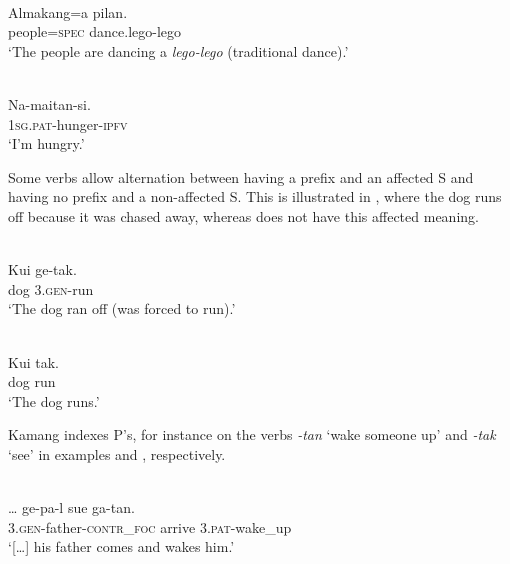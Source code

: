 \ea 
\label{ex:10:1235}
 \\
 \gll      Almakang=a   pilan.    \\
    people=\textsc{spec} dance.lego-lego    \\
 \glt  `The people are dancing a \textit{lego-lego} (traditional dance).'
\z

 

 




\ea%
\label{bkm:Ref353455458}
 \\
\gll     Na-maitan-si. \\  
    \textsc{1sg.pat-}hunger-\textsc{ipfv}  \\
\glt  `I'm hungry.'
\z

 





Some verbs allow alternation between having a prefix and an affected S and having no prefix and a non-affected S. This is illustrated in , where the dog runs off because it was chased away, whereas  does not have this affected meaning.


\ea%
\label{bkm:Ref353455505}
 \\
\gll   Kui  ge-tak.     \\  
     dog  3.\textsc{gen}{}-run     \\
\glt  `The dog ran off (was forced to run).'
\z




 



\ea%
\label{bkm:Ref324857914}
 \\
\gll    Kui  tak.  \\  
     dog  run   \\
\glt  `The dog runs.'
\z







Kamang indexes P's, for instance on the verbs \textit{{}-tan} `wake someone up' and \textit{{}-tak} `see' in examples  and , respectively.


\ea 
\label{ex:10:1236}
 \\
 \gll    {\ob}\dots{\cb}  ge-pa-l  sue  ga-tan.  \\
    [{\dots}]  3.\textsc{gen}{}-father-\textsc{contr\_foc} arrive  3.\textsc{pat}{}-wake\_up   \\
 \glt  `[{\dots}] his father comes and wakes him.'
\z








